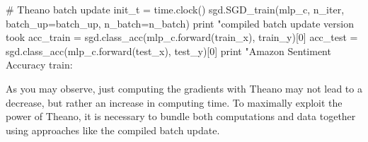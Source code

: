 \begin{exercise}
\begin{python}
# Theano batch update
init_t = time.clock()
sgd.SGD_train(mlp_c, n_iter, batch_up=batch_up, n_batch=n_batch)
print "\nTheano compiled batch update version took %
acc_train = sgd.class_acc(mlp_c.forward(train_x), train_y)[0]
acc_test  = sgd.class_acc(mlp_c.forward(test_x), test_y)[0]
print "Amazon Sentiment Accuracy train: %
\end{python}
As you may observe, just computing the gradients with Theano may not lead to
a decrease, but rather an increase in computing time. To maximally exploit
the power of Theano, it is necessary to bundle both computations and data 
together using approaches like the compiled batch update.
\end{exercise}